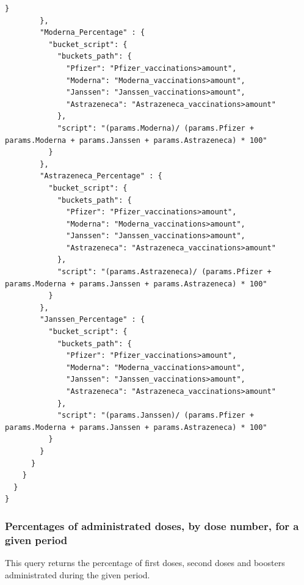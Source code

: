 \documentclass{article}
\begin{document}
\begin{lstlisting}[language=cypher, label=lst:cypher-example]
          }
        },
        "Moderna_Percentage" : {
          "bucket_script": {
            "buckets_path": {
              "Pfizer": "Pfizer_vaccinations>amount",
              "Moderna": "Moderna_vaccinations>amount",
              "Janssen": "Janssen_vaccinations>amount",
              "Astrazeneca": "Astrazeneca_vaccinations>amount"
            },
            "script": "(params.Moderna)/ (params.Pfizer + params.Moderna + params.Janssen + params.Astrazeneca) * 100"
          }
        },
        "Astrazeneca_Percentage" : {
          "bucket_script": {
            "buckets_path": {
              "Pfizer": "Pfizer_vaccinations>amount",
              "Moderna": "Moderna_vaccinations>amount",
              "Janssen": "Janssen_vaccinations>amount",
              "Astrazeneca": "Astrazeneca_vaccinations>amount"
            },
            "script": "(params.Astrazeneca)/ (params.Pfizer + params.Moderna + params.Janssen + params.Astrazeneca) * 100"
          }
        },
        "Janssen_Percentage" : {
          "bucket_script": {
            "buckets_path": {
              "Pfizer": "Pfizer_vaccinations>amount",
              "Moderna": "Moderna_vaccinations>amount",
              "Janssen": "Janssen_vaccinations>amount",
              "Astrazeneca": "Astrazeneca_vaccinations>amount"
            },
            "script": "(params.Janssen)/ (params.Pfizer + params.Moderna + params.Janssen + params.Astrazeneca) * 100"
          }
        }
      }
    }
  }
}

\end{lstlisting}
\newpage
\subsubsection{Percentages of administrated doses,  by dose number, for a given period}
This query returns the percentage of first doses, second doses and boosters administrated during the given period.
\end{document}
